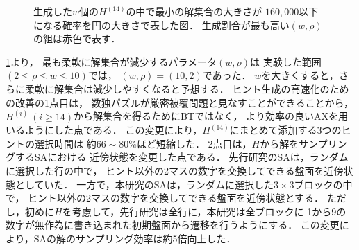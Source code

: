 \documentclass[a4paper, 9pt]{jarticle}
\begin{document}
\begin{論文概要}
\begin{figure}[bt]
{  生成した$w$個の$H^{(14)}$の中で最小の解集合の大きさが
  $160,000$以下になる確率を円の大きさで表した図．
  生成割合が最も高い$(w, \rho)$の組は赤色で表す．} 
  \label{fig:best_beam_width_and_rho}
\end{figure}
\figurename{\ref{fig:best_beam_width_and_rho}}より，
最も柔軟に解集合が減少するパラメータ$(w, \rho)$は
実験した範囲$(2 \leq \rho \leq w \leq 10)$では，
$(w, \rho) = (10, 2)$であった．
$w$を大きくすると，さらに柔軟に解集合は減少しやすくなると予想する．
ヒント生成の高速化のための改善の1点目は，
数独パズルが厳密被覆問題と見なすことができることから，
$H^{(i)} ~ (i \geq 14)$から解集合を得るためにBTではなく，
より効率の良いAXを用いるようにした点である．
この変更により，$H^{(14)}$にまとめて添加する3つのヒントの選択時間は
約$66 \sim 80$\%ほど短縮した．
2点目は，$H$から解をサンプリングするSAにおける
近傍状態を変更した点である．
先行研究のSAは，ランダムに選択した行の中で，
ヒント以外の2マスの数字を交換してできる盤面を近傍状態としていた．
一方で，本研究のSAは，ランダムに選択した$3 \times 3$ブロックの中で，
ヒント以外の2マスの数字を交換してできる盤面を近傍状態とする．
ただし，初めに$H$を考慮して，先行研究は全行に，本研究は全ブロックに
1から9の数字が無作為に書き込まれた初期盤面から遷移を行うようにする．
この変更により，SAの解のサンプリング効率は約5倍向上した．


\end{論文概要}
\end{document}
